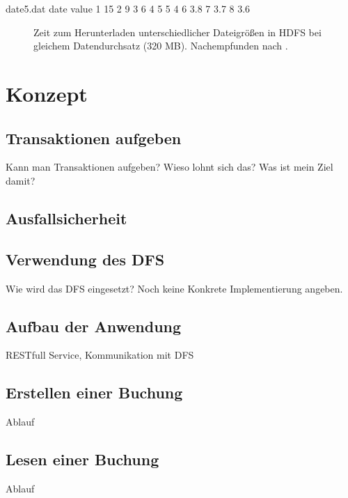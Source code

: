 \documentclass[12pt,oneside,a4paper,parskip]{scrbook}
\begin{document}
\begin{filecontents}{date5.dat}
date  value
1   15
2   9
3   6
4   5
5   4
6   3.8
7   3.7
8   3.6
\end{filecontents}


\begin{figure}
\begin{center}
\caption[Zeit zum Herunterladen unterschiedlicher Dateigrößen in HDFS]{Zeit zum Herunterladen unterschiedlicher Dateigrößen in HDFS bei gleichem Datendurchsatz (320 MB). Nachempfunden nach \cite{hdfsSmallFiles}.}
\label{hdfsSmallFiles}
\end{center}
\end{figure}

\chapter{Konzept}
\section{Transaktionen aufgeben}
Kann man Transaktionen aufgeben? Wieso lohnt sich das? Was ist mein Ziel damit?
\section{Ausfallsicherheit}
\section{Verwendung des DFS}
Wie wird das DFS eingesetzt? Noch keine Konkrete Implementierung angeben.
\section{Aufbau der Anwendung}
RESTfull Service, Kommunikation mit DFS
\section{Erstellen einer Buchung}
Ablauf
\section{Lesen einer Buchung}
Ablauf
\end{document}
